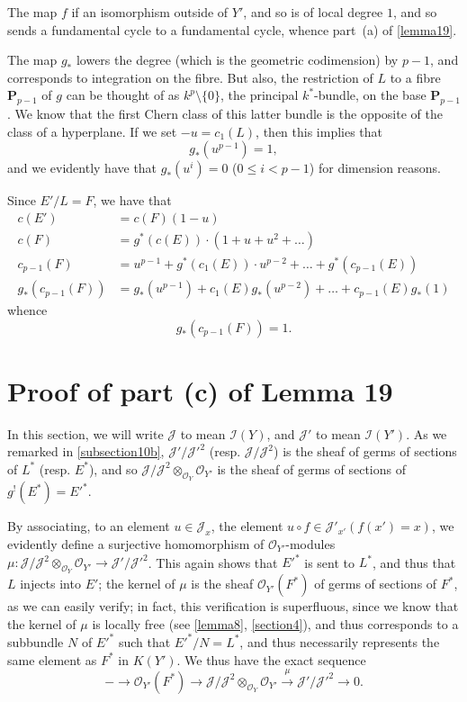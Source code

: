\documentclass{article}
\theoremstyle{plain}
\theoremstyle{definition}
\newcommand{\sh}[1]{{\mathscr{#1}}}
\newcommand{\PP}{\mathbf{P}}
\renewcommand{\leq}{\leqslant}
\newcommand{\oldpage}[1]{\marginpar{\footnotesize$\Big\vert$ \textit{p.~#1}}}
\begin{document}
The map $f$ if an isomorphism outside of $Y'$, and so is of local degree $1$, and so sends a fundamental cycle to a fundamental cycle, whence part~(a) of \cref{lemma19}.

The map $g_*$ lowers the degree (which is the geometric codimension) by $p-1$, and corresponds to integration on the fibre.
But also, the restriction of $L$ to a fibre $\PP_{p-1}$ of $g$ can be thought of as $k^p\setminus\{0\}$, the principal $k^*$-bundle, on the base $\PP_{p-1}$.
We know that the first Chern class of this latter bundle is the opposite of the class of a hyperplane.
If we
\oldpage{130}
set $-u=c_1(L)$, then this implies that
\[
  g_*(u^{p-1}) = 1,
\]
and we evidently have that $g_*(u^i)=0$ ($0\leq i<p-1$) for dimension reasons.

Since $E'/L=F$, we have that
\begin{align*}
  c(E') &= c(F)(1-u)
\\c(F) &= g^*(c(E))\cdot(1+u+u^2+\ldots)
\\c_{p-1}(F) &= u^{p-1}+g^*(c_1(E))\cdot u^{p-2} +\ldots+ g^*(c_{p-1}(E))
\\g_*(c_{p-1}(F)) &= g_*(u^{p-1})+c_1(E)g_*(u^{p-2}) +\ldots+ c_{p-1}(E)g_*(1)
\end{align*}
whence
\[
  g_*(c_{p-1}(F)) = 1.
\]


\section{Proof of part (c) of Lemma 19}
\label{section15}

In this section, we will write $\sh{J}$ to mean $\sh{I}(Y)$, and $\sh{J}'$ to mean $\sh{I}(Y')$.
As we remarked in \cref{subsection10b}, $\sh{J}'/\sh{J}'^2$ (resp. $\sh{J}/\sh{J}^2$) is the sheaf of germs of sections of $L^*$ (resp. $E^*$), and so $\sh{J}/\sh{J}^2\otimes_{\sh{O}_Y}\sh{O}_{Y'}$ is the sheaf of germs of sections of $g^!(E^*)=E'^*$.

By associating, to an element $u\in\sh{J}_x$, the element $u\circ f\in\sh{J}'_{x'}(f(x')=x)$, we evidently define a surjective homomorphism of $\sh{O}_{Y'}$-modules $\mu\colon\sh{J}/\sh{J}^2\otimes_{\sh{O}_Y}\sh{O}_{Y'}\to\sh{J}'/\sh{J}'^2$.
This again shows that $E'^*$ is sent to $L^*$, and thus that $L$ injects into $E'$;
the kernel of $\mu$ is the sheaf $\sh{O}_{Y'}(F^*)$ of germs of sections of $F^*$, as we can easily verify;
in fact, this verification is superfluous, since we know that the kernel of $\mu$ is locally free (see \cref{lemma8}, \cref{section4}), and thus corresponds to a subbundle $N$ of $E'^*$ such that $E'^*/N=L^*$, and thus necessarily represents the same element as $F^*$ in $K(Y')$.
We thus have the exact sequence
\[
\label{section15equation1}
  - \to \sh{O}_{Y'}(F^*) \to \sh{J}/\sh{J}^2\otimes_{\sh{O}_Y}\sh{O}_{Y'} \xrightarrow{\mu} \sh{J}'/\sh{J}'^2 \to 0.
  \tag{1}
\]
\end{document}
